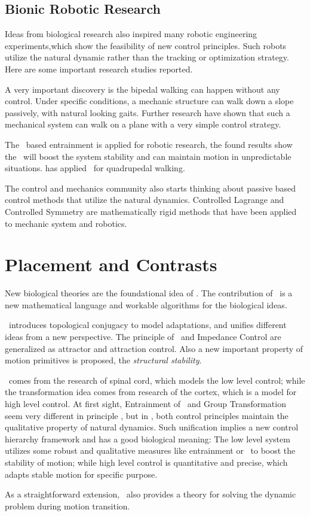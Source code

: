 \subsection{Bionic Robotic Research}
Ideas from biological research  also inspired many robotic engineering experiments,which show the feasibility of new control principles.
Such robots utilize the natural dynamic rather than the tracking or optimization strategy.
Here are some important research studies reported.
\begin{itemize}
A very important discovery is the bipedal walking can happen without any control\citep{McGeer1990}.  
Under specific conditions, a mechanic structure can walk down a slope passively, with natural looking gaits.
Further research have shown that such a mechanical system can walk on a plane with a very simple control strategy\citep{Collins2005}.

The \cpg\ based entrainment is applied for robotic research\citep{Williamson1999a}, the found results show the \cpg\ will boost the system stability and can maintain motion in unpredictable situations.
\citet{fukuoka2003adaptive} has applied \cpg\ for quadrupedal walking.

The control and mechanics community also starts thinking about passive based control methods that utilize the natural dynamics.
Controlled Lagrange \citep{bloch2000controlled,bloch2001controlled,bloch2000potential}and Controlled Symmetry \citep{spong1998underactuated,Spong96energybased} are mathematically rigid methods that have been applied to mechanic system and robotics\citep{spong2005controlled}.
\end{itemize}

\section{Placement and Contrasts}
New biological theories are the foundational idea of \moit.
The contribution of \moit\ is a new mathematical language and workable algorithms for the biological ideas.

\moit\ introduces topological conjugacy to model adaptations,   and unifies different ideas from a new  perspective.
The principle of \eph\ and Impedance Control are generalized as attractor and attraction control.
Also a new important property of  motion primitives is proposed, the \emph{structural stability}.


\cpg\ comes from the research of spinal cord, which models the low level control; while the transformation idea comes from research of the cortex, which is a model for high level control.
At first sight, Entrainment of \cpg\ and Group Transformation seem very different in principle , but  in \moit, both control principles maintain the qualitative property of natural dynamics.
Such unification implies a new control hierarchy framework and has a good biological meaning: 
The low level system utilizes some robust and qualitative measures like entrainment or \cpg\ to boost the stability of motion;
while high level control is quantitative and  precise, which adapts stable motion for specific purpose.

As a straightforward extension, \moit\ also provides a theory for solving the dynamic problem during motion transition.


 

 



